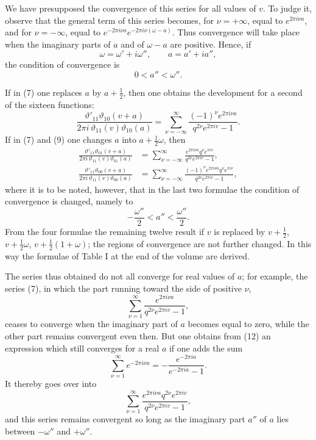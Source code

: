 \documentclass[11pt]{article}
\providecommand{\tht}{\vartheta}
\begin{document}
We have presupposed the convergence of this series for all values of $v$. To judge it, observe that the general term of this series becomes, for $\nu=+\infty$, equal to $e^{2\pi i\nu a}$, and for $\nu=-\infty$, equal to $e^{-2\pi i\nu a}e^{-2\pi i\nu(\omega-a)}$. Thus convergence will take place when the imaginary parts of $a$ and of $\omega-a$ are positive. Hence, if
\[
\omega=\omega'+i\omega'',\qquad a=a'+ia'',
\]
the condition of convergence is
\begin{equation}
0<a''<\omega''.
\tag{8}
\end{equation}

If in (7) one replaces $a$ by $a+\frac12$, then one obtains the development for a second of the sixteen functions:
\begin{equation}
\frac{\tht'_{11}\tht_{10}(v+a)}{2\pi i\,\tht_{11}(v)\tht_{10}(a)}
=\sum_{\nu=-\infty}^{\infty}\frac{(-1)^\nu e^{2\pi i\nu a}}{q^{2\nu}e^{2\pi iv}-1}.
\tag{9}
\end{equation}
If in (7) and (9) one changes $a$ into $a+\frac12\omega$, then
\begin{align}
\frac{\tht'_{11}\tht_{01}(v+a)}{2\pi i\,\tht_{11}(v)\tht_{01}(a)}
&=\sum_{\nu=-\infty}^{\infty}\frac{e^{2\pi i\nu a}q^\nu e^{\pi iv}}{q^{2\nu}e^{2\pi iv}-1}, \tag{10}\\
\frac{\tht'_{11}\tht_{00}(v+a)}{2\pi i\,\tht_{11}(v)\tht_{00}(a)}
&=\sum_{\nu=-\infty}^{\infty}\frac{(-1)^\nu e^{2\pi i\nu a}q^\nu e^{\pi iv}}{q^{2\nu}e^{2\pi iv}-1}, \tag{11}
\end{align}
where it is to be noted, however, that in the last two formulae the condition of convergence is changed, namely to
\[
-\frac{\omega''}{2}<a''<\frac{\omega''}{2}.
\]
From the four formulae the remaining twelve result if $v$ is replaced by $v+\frac12$, $v+\frac12\omega$, $v+\frac12(1+\omega)$; the regions of convergence are not further changed. In this way the formulae of Table I at the end of the volume are derived.

The series thus obtained do not all converge for real values of $a$; for example, the series (7), in which the part running toward the side of positive $\nu$,
\begin{equation}
\sum_{\nu=1}^{\infty}\frac{e^{2\pi i\nu a}}{q^{2\nu}e^{2\pi iv}-1},
\tag{12}
\end{equation}
ceases to converge when the imaginary part of $a$ becomes equal to zero, while the other part remains convergent even then. But one obtains from (12) an expression which still converges for a real $a$ if one adds the sum
\begin{equation}
\sum_{\nu=1}^{\infty}e^{-2\pi i\nu a}=-\frac{e^{-2\pi ia}}{e^{-2\pi ia}-1}.
\tag{13}
\end{equation}
It thereby goes over into
\[
\sum_{\nu=1}^{\infty}\frac{e^{2\pi i\nu a}q^{2\nu}e^{2\pi iv}}{q^{2\nu}e^{2\pi iv}-1},
\]
and this series remains convergent so long as the imaginary part $a''$ of $a$ lies between $-\omega''$ and $+\omega''$.
\end{document}
